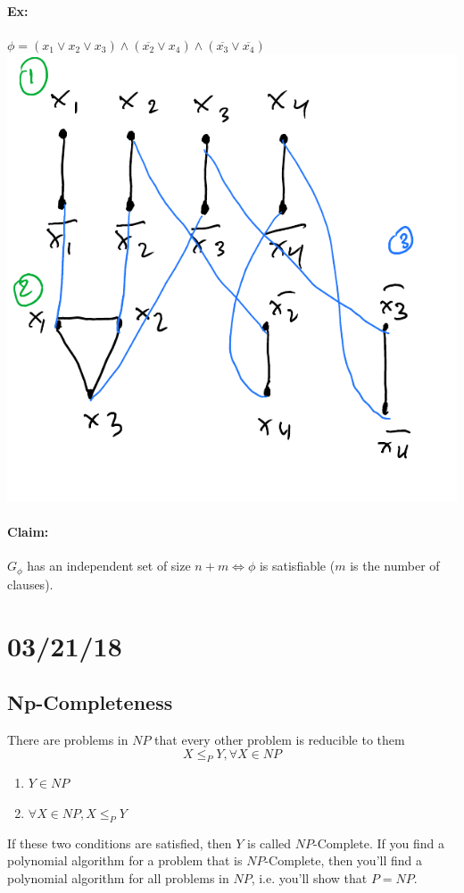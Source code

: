 \documentclass[12 pt]{article}
\begin{document}
          \paragraph{Ex:} $\phi = (x_1 \lor x_2 \lor x_3) \land
          (\overline{x_2} \lor x_4) \land (\overline{x_3} \lor
          \overline{x_4})$
          \\ \includegraphics[width=.9\textwidth]{i127.pdf}
          \paragraph{Claim:} $G_{\phi}$ has an independent set of size
          $n+m \iff \phi$ is satisfiable ($m$ is the number of
          clauses).
          \section{03/21/18}
          \subsection{Np-Completeness} There are problems in $NP$ that
          every other problem is reducible to them
          $$ X \leq_P Y, \forall X \in NP$$
          \begin{enumerate}
          \item $Y \in NP$
          \item $\forall X \in NP, X \leq_P Y$
          \end{enumerate}
          If these two conditions are satisfied, then $Y$ is called
          $NP$-Complete. If you find a polynomial algorithm for a
          problem that is $NP$-Complete, then you'll find a
          polynomial algorithm for all problems in $NP$, i.e. you'll
          show that $P=NP$.
\end{document}
